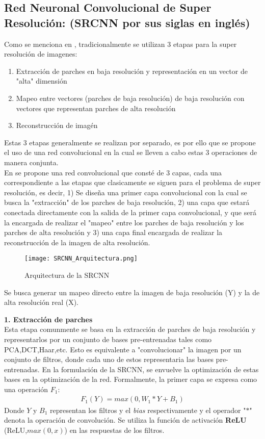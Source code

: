 \subsection{Red Neuronal Convolucional de Super Resolución: (SRCNN por sus siglas en inglés)}
Como se menciona en \cite{freeman}, tradicionalmente se utilizan 3 etapas para la super resolución de imagenes:
\begin{enumerate}
    \item Extracción de parches en baja resolución y representación en un vector de "alta" dimensión
    \item Mapeo entre vectores (parches de baja resolución) de baja resolución con vectores que representan parches de alta
    resolución
    \item Reconstrucción de imagén
\end{enumerate}
Estas 3 etapas generalmente se realizan por separado, es por ello que se propone el uso de una red convolucional en la cual se
lleven a cabo estas 3 operaciones de manera conjunta.\\
En \cite{SRCNN} se propone una red convolucional que consté de 3 capas, cada una correspondiente a las etapas que clasicamente
se siguen para el problema de super resolución, es decir, 1) Se diseña una primer capa convolucional con la cual se busca la
"extracción" de los parches de baja resolución, 2) una capa que estará conectada directamente con la salida de la primer capa
convolucional, y que será la encargada de realizar el "mapeo" entre los parches de baja resolución y los parches de alta
resolución y 3) una capa final encargada de realizar la reconstrucción de la imagen de alta resolución.

\begin{figure}[H]
    \label{fig:SRCNN_Arquitectura}
    \centering
    \texttt{[image: SRCNN\_Arquitectura.png]}
    \caption{Arquitectura de la SRCNN}
\end{figure}

Se busca generar un mapeo directo entre la imagen de baja resolución (Y) y la de alta resolución real (X).

\textbf{1. Extracción de parches}\\
Esta etapa comunmente se basa en la extracción de parches de baja resolución y representarlos por un conjunto de bases pre-entrenadas
tales como PCA,DCT,Haar,etc. Esto es equivalente a "convolucionar" la imagen por un conjunto de filtros, donde cada uno de estos
representaria las bases pre-entrenadas. En la formulación de la SRCNN, se envuelve la optimización de estas bases en la optimización
de la red. Formalmente, la primer capa se expresa como una operación $F_1$:
\begin{align}
    \label{eqn:SRCNN_FirstLayer}
    F_1(Y)=max(0,W_1*Y+B_1)
\end{align}
Donde $Y$ y $B_1$ representan los filtros y el \emph{bias} respectivamente y el operador "$*$" denota la operación de convolución.
Se utiliza la función de activación \textbf{ReLU} (ReLU,$max(0,x)$) en las respuestas de los filtros.\\

